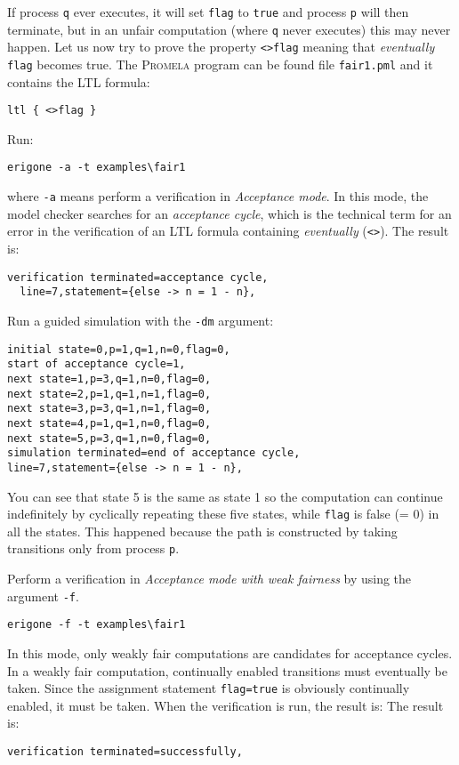 \documentclass[11pt]{article}
\newcommand*{\prm}{\textsc{Promela}}
\newcommand*{\p}[1]{\texttt{#1}}
\begin{document}
If process \p{q} ever executes, it will set \p{flag} to \p{true} and
process \p{p} will then terminate, but in an unfair computation (where
\p{q} never executes) this may never happen. Let us now try to prove the
property \p{<>flag} meaning that \emph{eventually} \p{flag} becomes
true. The \prm{} program can be found file \p{fair1.pml} and it
contains the LTL formula:

\begin{verbatim}
ltl { <>flag }
\end{verbatim}

Run:
\begin{verbatim}
erigone -a -t examples\fair1
\end{verbatim}

where \p{-a} means perform a verification in \emph{Acceptance mode}. In
this mode, the model checker searches for an \emph{acceptance cycle},
which is the technical term for an error in the verification of an LTL
formula containing \emph{eventually} (\p{<>}). The result is:

\begin{verbatim}
verification terminated=acceptance cycle,
  line=7,statement={else -> n = 1 - n},
\end{verbatim}

Run a guided simulation with the \p{-dm} argument:
\begin{verbatim}
initial state=0,p=1,q=1,n=0,flag=0,
start of acceptance cycle=1,
next state=1,p=3,q=1,n=0,flag=0,
next state=2,p=1,q=1,n=1,flag=0,
next state=3,p=3,q=1,n=1,flag=0,
next state=4,p=1,q=1,n=0,flag=0,
next state=5,p=3,q=1,n=0,flag=0,
simulation terminated=end of acceptance cycle,
line=7,statement={else -> n = 1 - n},
\end{verbatim}

You can see that state 5 is the same as state 1 so the computation can
continue indefinitely by cyclically repeating these five states, while
\p{flag} is false (= 0) in all the states. This happened because the
path is constructed by taking transitions only from process \p{p}.

Perform a verification in \emph{Acceptance mode with weak fairness}
by using the argument \p{-f}.

\begin{verbatim}
erigone -f -t examples\fair1
\end{verbatim}

In this mode, only weakly fair computations are candidates for
acceptance cycles. In a weakly fair computation, continually enabled
transitions must eventually be taken. Since the assignment statement
\p{flag=true} is obviously continually enabled, it must be taken. When
the verification is run, the result is: The result is:

\begin{verbatim}
verification terminated=successfully,
\end{verbatim}
\end{document}
